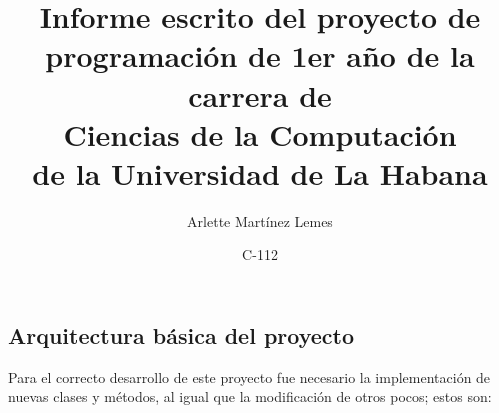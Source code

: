 \documentclass[a4paper,12pt]{article}
\begin{document}
\title{Informe escrito del proyecto de \\programación de 1er año de la carrera
 de\\ Ciencias de la Computación \\de la Universidad de La Habana}
\author{Arlette Martínez Lemes}
\date{C-112}
\maketitle


\newpage

\tableofcontents

\newpage

\begin{center}
   \section{Arquitectura básica del proyecto}
\end{center}

 Para el correcto desarrollo de este proyecto fue necesario la implementación 
 de nuevas clases y métodos, al igual que la modificación de otros pocos; estos
 son:
\end{document}
